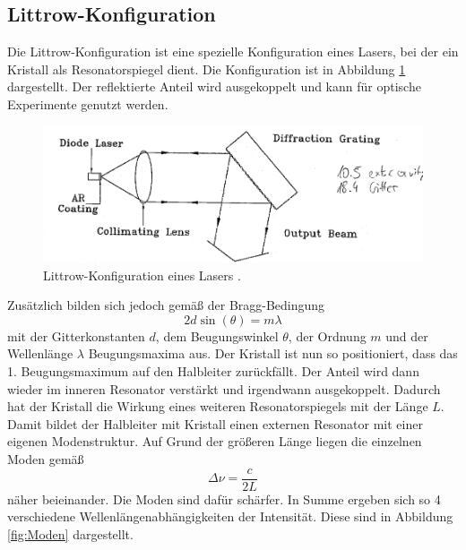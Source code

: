 \subsection{Littrow-Konfiguration}
Die Littrow-Konfiguration ist eine spezielle Konfiguration eines Lasers, bei der ein Kristall als Resonatorspiegel dient.
Die Konfiguration ist in Abbildung \ref{fig:Littrow} dargestellt. Der reflektierte Anteil wird ausgekoppelt und kann für optische Experimente genutzt werden.
\begin{figure}[H]
    \centering
    \includegraphics[scale=0.8]{pictures/Littrow.png}
    \caption{Littrow-Konfiguration eines Lasers \cite{teachspin}.}
    \label{fig:Littrow}
\end{figure}
\noindent Zusätzlich bilden sich jedoch gemäß der Bragg-Bedingung
\begin{equation}
    2d\sin(\theta)=m\lambda
\end{equation}
mit der Gitterkonstanten $d$, dem Beugungswinkel $\theta$, der Ordnung $m$ und der Wellenlänge $\lambda$ Beugungsmaxima aus. 
Der Kristall ist nun so positioniert, dass das 1. Beugungsmaximum auf den Halbleiter zurückfällt.
Der Anteil wird dann wieder im inneren Resonator verstärkt und irgendwann ausgekoppelt. Dadurch hat der Kristall 
die Wirkung eines weiteren Resonatorspiegels mit der Länge $L$. Damit bildet der Halbleiter mit Kristall einen externen Resonator
mit einer eigenen Modenstruktur. Auf Grund der größeren Länge liegen die einzelnen Moden gemäß 
\begin{equation}
    \Delta \nu = \frac{c}{2L}
\end{equation}
näher beieinander. Die Moden sind dafür schärfer. In Summe ergeben sich so 4 verschiedene Wellenlängenabhängigkeiten der Intensität.
Diese sind in Abbildung \ref{fig:Moden} dargestellt.
